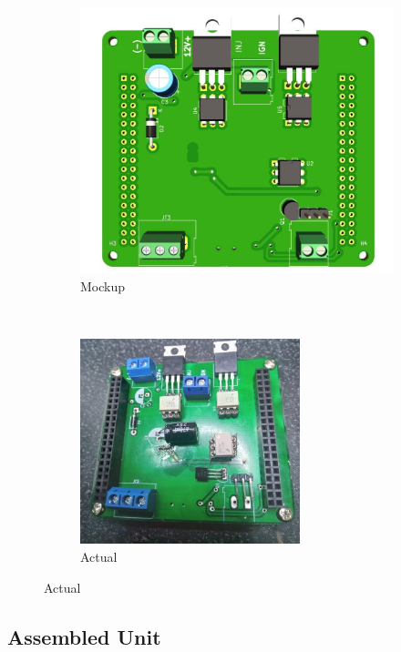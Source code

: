 \documentclass[a4paper,12pt,oneside,pdflatex,italian,final,twocolumn]{article}
\begin{document}
	\begin{figure}[h]
		\centering
		\begin{subfigure}[b]{0.32\textwidth}
			\includegraphics[width=\textwidth]{images/shield_top.jpg}
			\caption{Mockup}
		\end{subfigure}
		~
		\begin{subfigure}[b]{0.32\textwidth}
			\includegraphics[width=0.7\textwidth,rotate=-90]{images/pcb_top.jpg}
			\caption{Actual}
		\end{subfigure}
	\end{figure}

	\subsection{Assembled Unit}
	
\end{document}
